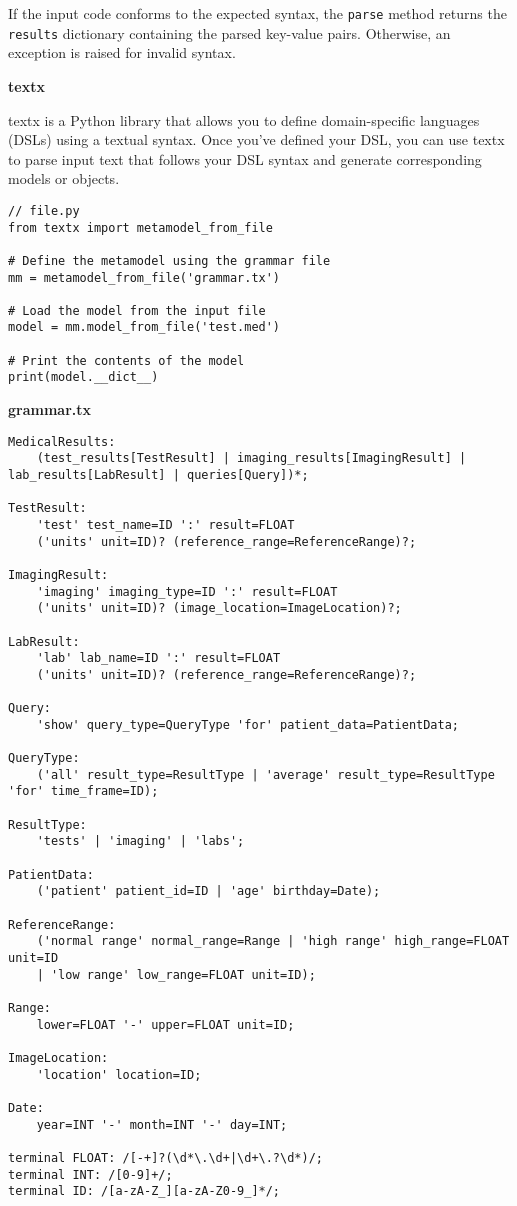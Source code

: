 If the input code conforms to the expected syntax, the \texttt{parse} method returns the \texttt{results} dictionary containing the parsed key-value pairs. Otherwise, an exception is raised for invalid syntax.



\textbf{textx}

textx is a Python library that allows you to define domain-specific languages (DSLs) using a textual syntax. Once you've defined your DSL, you can use textx to parse input text that follows your DSL syntax and generate corresponding models or objects.

\begin{lstlisting}
// file.py
from textx import metamodel_from_file

# Define the metamodel using the grammar file
mm = metamodel_from_file('grammar.tx')

# Load the model from the input file
model = mm.model_from_file('test.med')

# Print the contents of the model
print(model.__dict__)
\end{lstlisting}

\textbf{grammar.tx}
\begin{lstlisting}
MedicalResults:
    (test_results[TestResult] | imaging_results[ImagingResult] | lab_results[LabResult] | queries[Query])*;

TestResult:
    'test' test_name=ID ':' result=FLOAT 
    ('units' unit=ID)? (reference_range=ReferenceRange)?;

ImagingResult:
    'imaging' imaging_type=ID ':' result=FLOAT 
    ('units' unit=ID)? (image_location=ImageLocation)?;

LabResult:
    'lab' lab_name=ID ':' result=FLOAT 
    ('units' unit=ID)? (reference_range=ReferenceRange)?;

Query:
    'show' query_type=QueryType 'for' patient_data=PatientData;

QueryType:
    ('all' result_type=ResultType | 'average' result_type=ResultType 'for' time_frame=ID);

ResultType:
    'tests' | 'imaging' | 'labs';

PatientData:
    ('patient' patient_id=ID | 'age' birthday=Date);

ReferenceRange:
    ('normal range' normal_range=Range | 'high range' high_range=FLOAT unit=ID 
    | 'low range' low_range=FLOAT unit=ID);

Range:
    lower=FLOAT '-' upper=FLOAT unit=ID;

ImageLocation:
    'location' location=ID;

Date:
    year=INT '-' month=INT '-' day=INT;

terminal FLOAT: /[-+]?(\d*\.\d+|\d+\.?\d*)/;
terminal INT: /[0-9]+/;
terminal ID: /[a-zA-Z_][a-zA-Z0-9_]*/;
\end{lstlisting}

